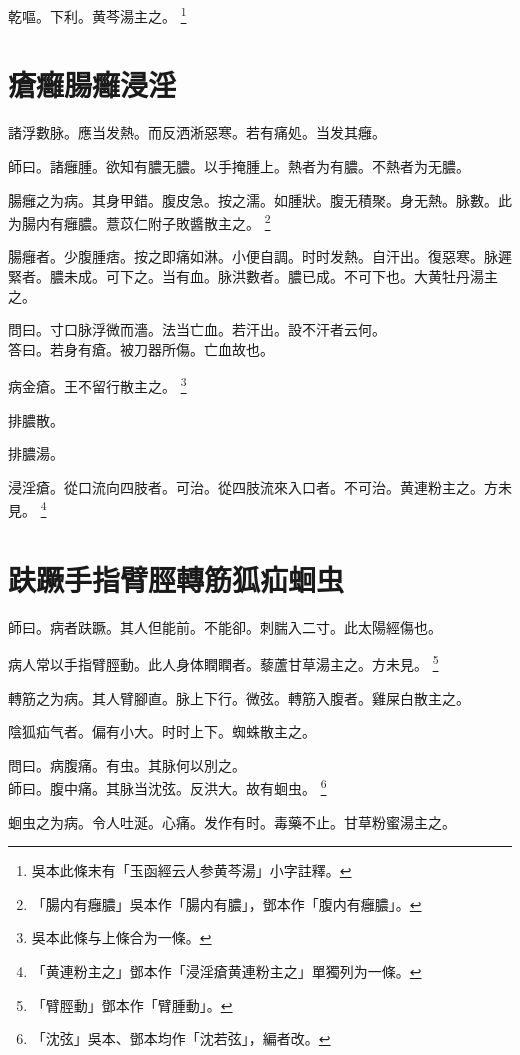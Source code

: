 乾嘔。下利。黄芩湯主之。
	\footnote{
		吳本此條末有「玉函經云人参黄芩湯」小字註釋。
	}

\chapter{瘡癰腸癰浸淫}

諸浮數脉。應当发熱。而反洒淅惡寒。若有痛処。当发其癰。

師曰。諸癰腫。欲知有膿无膿。以手掩腫上。熱者为有膿。不熱者为无膿。

腸癰之为病。其身甲錯。腹皮急。按之濡。如腫狀。腹无積聚。身无熱。脉數。此为腸内有{\khaai 癰}膿。薏苡{\khaai 仁}附子敗醬散主之。
	\footnote{
		「腸内有癰膿」吳本作「腸内有膿」，鄧本作「腹内有癰膿」。
	}

腸癰者。少腹腫痞。按之即痛如淋。小便自調。时时发熱。自汗出。復惡寒。脉遲緊者。膿未成。可下之。当有血。脉洪數者。膿已成。不可下也。大黄牡丹湯主之。

問曰。寸口脉浮微而濇。法当亡血。若汗出。設不汗者云何。\\
答曰。若身有瘡。被刀器所傷。亡血故也。

病金瘡。王不留行散主之。
	\footnote{
		吳本此條与上條合为一條。
	}

排膿散。

排膿湯。

浸淫瘡。從口流向四肢者。可治。從四肢流來入口者。不可治。黄連粉主之。{\scriptsize 方未見。}
	\footnote{
		「黄連粉主之」鄧本作「浸淫瘡黄連粉主之」單獨列为一條。
	}

\chapter{趺蹶手指臂脛轉筋狐疝蛔虫}

師曰。病者趺蹶。其人但能前。不能卻。刺腨入二寸。此太陽經傷也。

病人常以手指臂脛動。此人身体瞤瞤者。藜蘆甘草湯主之。{\scriptsize 方未見。}
	\footnote{
		「臂脛動」鄧本作「臂腫動」。
	}

轉筋之为病。其人臂腳直。脉上下行。微弦。轉筋入腹者。雞屎白散主之。

陰狐疝气者。偏有小大。时时上下。蜘蛛散主之。

問曰。病腹痛。有虫。其脉何以別之。\\
師曰。腹中痛。其脉当沈弦。反洪大。故有蛔虫。
	\footnote{「沈弦」吳本、鄧本均作「沈若弦」，編者改。}

蛔虫之为病。令人吐涎。心痛。发作有时。毒藥不止。甘草粉蜜湯主之。

